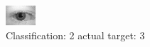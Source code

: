 \begin{figure}[h!]
\begin{center}
\includegraphics[width=0.60\columnwidth]{figures/ID567_class_2_target_3.png}
\end{center}
\caption{ Classification: 2 actual target: 3}
\label{fig:ID567_class_2_target_3}
\end{figure}
